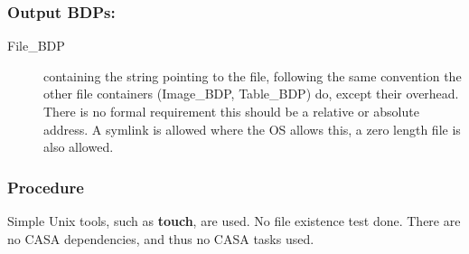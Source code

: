 \subsubsection{Output BDPs:}

\begin{description}

\item[File\_BDP] containing the string pointing to the file, following
  the same convention the other file containers (Image\_BDP,
  Table\_BDP) do, except their overhead.  There is no formal
  requirement this should be a relative or absolute address.  A
  symlink is allowed where the OS allows this, a zero length file is
  also allowed.

\end{description}

\subsubsection{Procedure}

Simple Unix tools, such as {\bf touch}, are used. No file existence test done.
There are no CASA dependencies, and thus no CASA tasks used.



\clearpage

